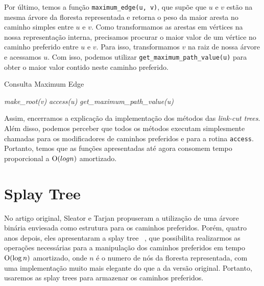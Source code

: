 Por último, temos a função \texttt{maximum\_edge(u, v)}, que supõe que $u$ e $v$ estão na mesma árvore da floresta representada e retorna o peso da maior aresta no caminho simples entre $u$ e $v$. Como transformamos as arestas em vértices na nossa representação interna, precisamos procurar o maior valor de um vértice no caminho preferido entre $u$ e $v$. Para isso, transformamos $v$ na raiz de nossa árvore e acessamos $u$. Com isso, podemos utilizar \texttt{get\_maximum\_path\_value(u)} para obter o maior valor contido neste caminho preferido.

\begin{algorithm}[h!]
    \caption{Consulta Maximum Edge}\label{lct:max-edge}
    \begin{algorithmic}[1]
        \State \emph{make\_root(v)}
        \State \emph{access(u)}
        \State \Return \emph{get\_maximum\_path\_value(u)}
        \EndFunction
    \end{algorithmic}
\end{algorithm}

Assim, encerramos a explicação da implementação dos métodos das \emph{link-cut trees}. Além disso, podemos perceber que todos os métodos executam simplesmente chamadas para os modificadores de caminhos preferidos e para a rotina \texttt{access}. Portanto, temos que as funções apresentadas até agora consomem tempo proporcional a $\mathrm{O}(log n)$ amortizado.

\section{Splay Tree}
\label{sec:lct-splay-trees}

No artigo original, Sleator e Tarjan propuseram a utilização de uma árvore binária enviesada como estrutura para os caminhos preferidos. Porém, quatro anos depois, eles apresentaram a splay tree ~\citep{10.1145/3828.3835}, que possibilita realizarmos as operações necessárias para a manipulação dos caminhos preferidos em tempo $\mathrm{O}(\log n)$ amortizado, onde $n$ é o numero de nós da floresta representada, com uma implementação muito mais elegante do que a da versão original. Portanto, usaremos as splay trees para armazenar os caminhos preferidos.

